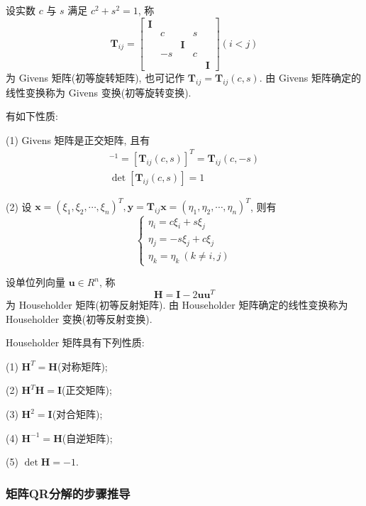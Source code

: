 \par 设实数 $c$ 与 $s$ 满足 $c^2 + s^2 = 1$, 称
$$
    \bm{T}_{ij} = \begin{bmatrix}
        \bm{I} &    &        &   &        \\
               & c  &        & s &        \\
               &    & \bm{I} &   &        \\
               & -s &        & c &        \\
               &    &        &   & \bm{I}
    \end{bmatrix} (i < j)
$$
为 Givens 矩阵(初等旋转矩阵), 也可记作 $\bm{T}_{ij} = \bm{T}_{ij}(c,s)$. 由 Givens 矩阵确定的线性变换称为 Givens 变换(初等旋转变换).

\par 有如下性质:
\par (1) Givens 矩阵是正交矩阵, 且有
\begin{gather*}
    [\bm{T}_{ij}(c,s)]^{-1} = [\bm{T}_{ij}(c,s)]^T = \bm{T}_{ij}(c,-s) \\
    \det[\bm{T}_{ij}(c,s)] = 1
\end{gather*}
\par (2) 设 $\bm{x} = (\xi_1, \xi_2, \cdots, \xi_n)^T, \bm{y} = \bm{T}_{ij}\bm{x} = (\eta_1, \eta_2, \cdots, \eta_n)^T$, 则有
$$
    \begin{cases}
        \eta_i = c\xi_i + s\xi_j  \\
        \eta_j = -s\xi_j + c\xi_j \\
        \eta_k = \eta_k \ (k\neq i, j)
    \end{cases}
$$

\par 设单位列向量 $\bm{u} \in R^n$, 称
$$
    \bm{H} = \bm{I} - 2\bm{uu}^T
$$
为 Householder 矩阵(初等反射矩阵). 由 Householder 矩阵确定的线性变换称为 Householder 变换(初等反射变换).

\par Householder 矩阵具有下列性质:
\par (1) $\bm{H}^T = \bm{H}$(对称矩阵);
\par (2) $\bm{H}^T\bm{H} = \bm{I}$(正交矩阵);
\par (3) $\bm{H}^2 = \bm{I}$(对合矩阵);
\par (4) $\bm{H}^{-1} = \bm{H}$(自逆矩阵);
\par (5) $\det\bm{H} = -1$.

\subsubsection{矩阵QR分解的步骤推导}

